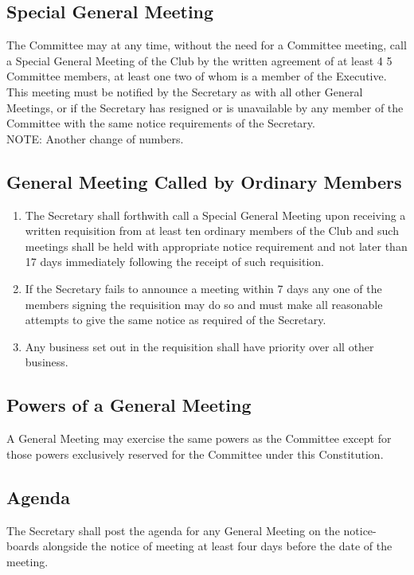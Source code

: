 \documentclass[11pt]{article} %
\begin{document}
\subsection{Special General Meeting}
The Committee may at any time, without the need for a Committee meeting, call a Special General Meeting of the Club by the written agreement of at least {\color{red}4} {\color{ForestGreen}5} Committee members, at least {\color{red}one} {\color{ForestGreen}two} of whom is a member of the Executive. This meeting must be notified by the Secretary as with all other General Meetings, or if the Secretary has resigned or is unavailable by any member of the Committee with the same notice requirements of the Secretary.\\
{\color{Cyan}NOTE:
Another change of numbers.
}

\subsection{General Meeting Called by Ordinary Members}
\begin{enumerate}
	\item The Secretary shall forthwith call a Special General Meeting upon receiving a written requisition from at least ten ordinary members of the Club and such meetings shall be held with appropriate notice requirement and not later than 17 days immediately following the receipt of such requisition.
	\item If the Secretary fails to announce a meeting within 7 days any one of the members signing the requisition may do so and must make all reasonable attempts to give the same notice as required of the Secretary.
	\item Any business set out in the requisition shall have priority over all other business.
\end{enumerate}

\subsection{Powers of a General Meeting}
A General Meeting may exercise the same powers as the Committee except for those powers exclusively reserved for the Committee under this Constitution.
\subsection{Agenda}
The Secretary shall post the agenda for any General Meeting on the notice-boards alongside the notice of meeting at least four days before the date of the meeting.
\end{document}
